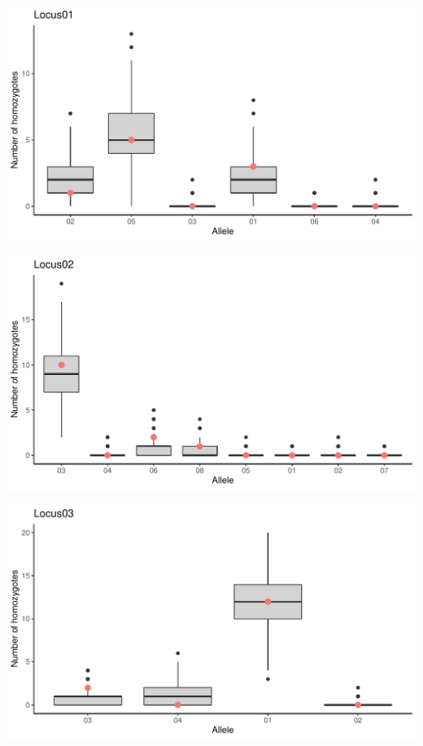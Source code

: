 \documentclass[a4paper]{scrartcl}\usepackage[]{graphicx}\usepackage[]{color}
\makeatletter
\def\maxwidth{ %
  \ifdim\Gin@nat@width>\linewidth
    \linewidth
  \else
    \Gin@nat@width
  \fi
}
\newenvironment{knitrout}{}{} %
\makeatother
\begin{document}
\noindent
\begin{knitrout}
\color{fgcolor}
\includegraphics[width=\maxwidth]{PopGenReport-null_all-1} 

\includegraphics[width=\maxwidth]{PopGenReport-null_all-2} 

\includegraphics[width=\maxwidth]{PopGenReport-null_all-3} 


\end{knitrout}
\end{document}
